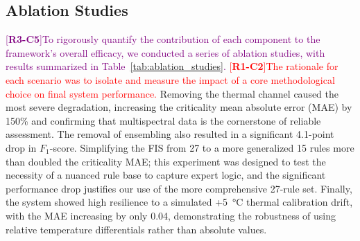 \documentclass[energies,article,submit,pdftex,moreauthors]{Definitions/mdpi}
\newcommand{\revtag}[2]{[\textbf{R#1-C#2}]}
\newcommand{\Rone}[1]{\textcolor{red}{#1}}
\newcommand{\Rthree}[1]{\textcolor{purple}{#1}}
\begin{document}
\subsection{Ablation Studies}
\Rthree{\revtag{3}{5}To rigorously quantify the contribution of each component to the framework's overall efficacy, we conducted a series of ablation studies, with results summarized in Table~\ref{tab:ablation_studies}.} \Rone{\revtag{1}{2}The rationale for each scenario was to isolate and measure the impact of a core methodological choice on final system performance.} Removing the thermal channel caused the most severe degradation, increasing the criticality mean absolute error (MAE) by 150\% and confirming that multispectral data is the cornerstone of reliable assessment. The removal of ensembling also resulted in a significant 4.1-point drop in \(F_{1}\)-score. Simplifying the FIS from 27 to a more generalized 15 rules more than doubled the criticality MAE; this experiment was designed to test the necessity of a nuanced rule base to capture expert logic, and the significant performance drop justifies our use of the more comprehensive 27-rule set. Finally, the system showed high resilience to a simulated +\SI{5}{\celsius} thermal calibration drift, with the MAE increasing by only 0.04, demonstrating the robustness of using relative temperature differentials rather than absolute values.
\end{document}

